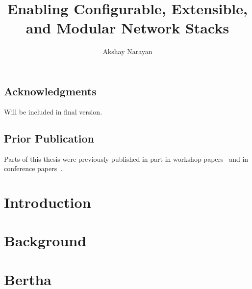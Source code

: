 \documentclass[fontsize=12pt,paper=letter,twosided,cleardoublepage=plain,final]{scrbook}
\title{Enabling Configurable, Extensible, and Modular Network Stacks}
\author{Akshay Narayan}
\begin{document}
\frontmatter



\cleardoublepage


\cleardoublepage

\section*{Acknowledgments}
\begin{spacing}{1}
%
Will be included in final version.
\end{spacing}
\cleardoublepage

\section*{Prior Publication}
Parts of this thesis were previously published in part in workshop papers~\cite{ccp, bertha} and in conference
papers~\cite{ccp, bundler, park}.
\cleardoublepage

\tableofcontents

\mainmatter

\chapter{Introduction}\label{s:intro}



\chapter{Background}\label{s:background}


\chapter{Bertha}\label{s:bertha}







\end{document}
